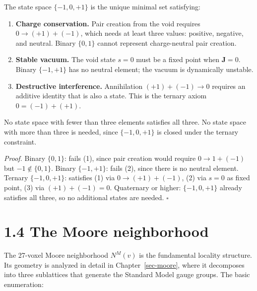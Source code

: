 \documentclass[
  11pt,
  letterpaper,
  twoside,
  openright]{book}
\begin{document}
\begin{ftdtheorem}

The state space \(\{-1, 0, +1\}\) is the unique minimal set satisfying:

\begin{enumerate}
\def\labelenumi{\arabic{enumi}.}
\item
  \textbf{Charge conservation.} Pair creation from the void requires
  \(0 \to (+1) + (-1)\), which needs at least three values: positive,
  negative, and neutral. Binary \(\{0, 1\}\) cannot represent
  charge-neutral pair creation.
\item
  \textbf{Stable vacuum.} The void state \(s = 0\) must be a fixed point
  when \(\mathbf{J} = 0\). Binary \(\{-1, +1\}\) has no neutral element;
  the vacuum is dynamically unstable.
\item
  \textbf{Destructive interference.} Annihilation \((+1) + (-1) \to 0\)
  requires an additive identity that is also a state. This is the
  ternary axiom \(0 = (-1) + (+1)\).
\end{enumerate}

No state space with fewer than three elements satisfies all three. No
state space with more than three is needed, since \(\{-1, 0, +1\}\) is
closed under the ternary constraint.

\end{ftdtheorem}

\emph{Proof.} Binary \(\{0, 1\}\): fails (1), since pair creation would
require \(0 \to 1 + (-1)\) but \(-1 \notin \{0,1\}\). Binary
\(\{-1, +1\}\): fails (2), since there is no neutral element. Ternary
\(\{-1, 0, +1\}\): satisfies (1) via \(0 \to (+1) + (-1)\), (2) via
\(s = 0\) as fixed point, (3) via \((+1) + (-1) = 0\). Quaternary or
higher: \(\{-1, 0, +1\}\) already satisfies all three, so no additional
states are needed. \(\square\)

\section{1.4 The Moore neighborhood}\label{the-moore-neighborhood}

The 27-voxel Moore neighborhood \(N^M(v)\) is the fundamental locality
structure. Its geometry is analyzed in detail in
Chapter~\ref{sec-moore}, where it decomposes into three sublattices that
generate the Standard Model gauge groups. The basic enumeration:
\end{document}

